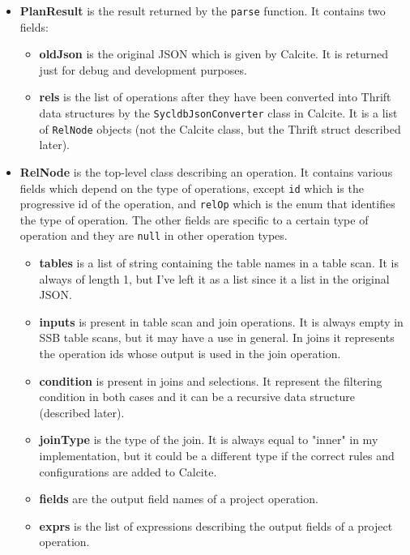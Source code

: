 \documentclass[a4paper, 10pt]{article}
\begin{document}
\begin{itemize}
    \item \textbf{PlanResult} is the result returned by the \texttt{parse} function. It contains two fields:
          \begin{itemize}
              \item \textbf{oldJson} is the original JSON which is given by Calcite. It is returned just for debug and development purposes.
              \item \textbf{rels} is the list of operations after they have been converted into Thrift data structures by the \texttt{SycldbJsonConverter} class in Calcite. It is a list of \texttt{RelNode} objects (not the Calcite class, but the Thrift struct described later).
          \end{itemize}
    \item \textbf{RelNode} is the top-level class describing an operation. It contains various fields which depend on the type of operations, except \texttt{id} which is the progressive id of the operation, and \texttt{relOp} which is the enum that identifies the type of operation. The other fields are specific to a certain type of operation and they are \texttt{null} in other operation types.
          \begin{itemize}
              \item \textbf{tables} is a list of string containing the table names in a table scan. It is always of length 1, but I've left it as a list since it a list in the original JSON.
              \item \textbf{inputs} is present in table scan and join operations. It is always empty in SSB table scans, but it may have a use in general. In joins it represents the operation ids whose output is used in the join operation.
              \item \textbf{condition} is present in joins and selections. It represent the filtering condition in both cases and it can be a recursive data structure (described later).
              \item \textbf{joinType} is the type of the join. It is always equal to "inner" in my implementation, but it could be a different type if the correct rules and configurations are added to Calcite.
              \item \textbf{fields} are the output field names of a project operation.
              \item \textbf{exprs} is the list of expressions describing the output fields of a project operation.

\end{itemize}
\end{itemize}
\end{document}
